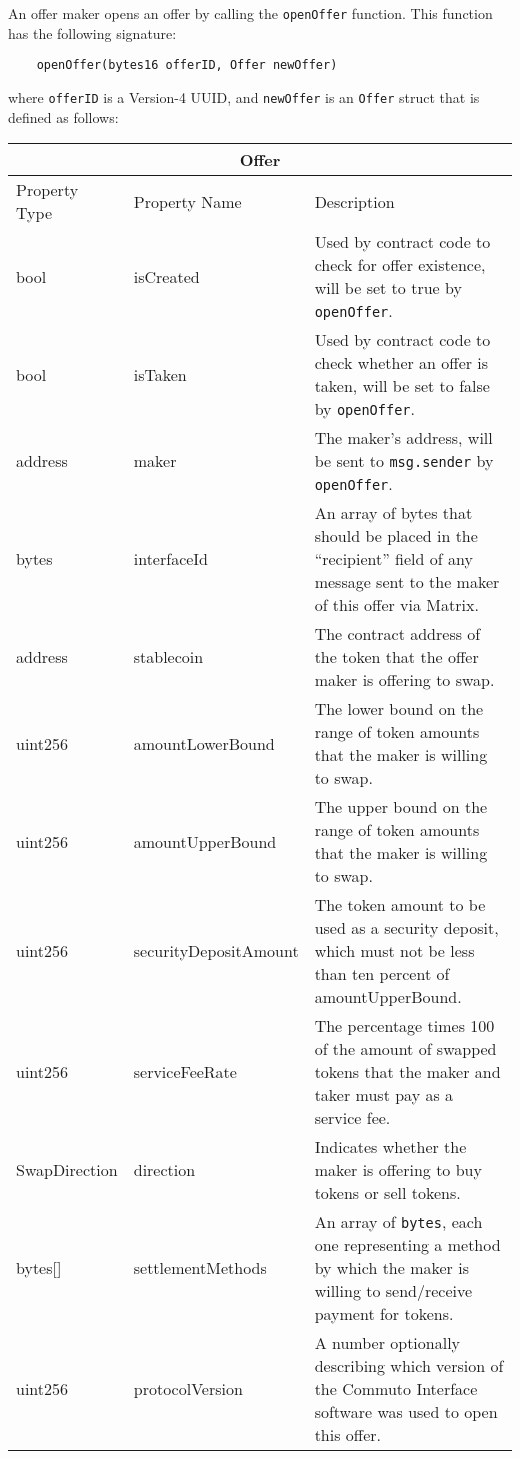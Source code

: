 \documentclass[11pt]{article}
\begin{document}
    An offer maker opens an offer by calling the \verb|openOffer| function.
    This function has the following signature:
    \begin{verbatim}
    openOffer(bytes16 offerID, Offer newOffer)
    \end{verbatim}
    where \verb|offerID| is a Version-4 UUID\cite{UUID}, and \verb|newOffer| is an \verb|Offer|
    struct that is defined as follows:
    \begin{longtable}[p]{ |p{2.5cm}|p{4cm}|p{7cm}| }
        \hline
        \multicolumn{3}{|c|}{Offer} \\
        \hline
        Property Type & Property Name & Description \\
        \hline
        bool & isCreated & Used by contract code to check for offer existence, will be set to true
        by \verb|openOffer|. \\
        bool & isTaken & Used by contract code to check whether an offer is taken, will be set to
        false by \verb|openOffer|. \\
        address & maker & The maker's address, will be sent to \verb|msg.sender| by \verb|openOffer|. \\
        bytes & interfaceId & An array of bytes that should be placed in the ``recipient'' field of any
        message sent to the maker of this offer via Matrix. \\
        address & stablecoin & The contract address of the token that the offer maker is offering to
        swap. \\
        uint256 & amountLowerBound & The lower bound on the range of token amounts that the maker is
        willing to swap. \\
        uint256 & amountUpperBound & The upper bound on the range of token amounts that the maker is
        willing to swap. \\
        uint256 & securityDepositAmount & The token amount to be used as a security deposit, which must
        not be less than ten percent of amountUpperBound. \\
        uint256 & serviceFeeRate & The percentage times 100 of the amount of swapped tokens that the
        maker and taker must pay as a service fee. \\
        SwapDirection & direction & Indicates whether the maker is offering to buy tokens or sell
        tokens. \\
        bytes[] & settlementMethods & An array of \verb|bytes|, each one representing a method by which
        the maker is willing to send/receive payment for tokens. \\
        uint256 & protocolVersion & A number optionally describing which version of the Commuto
        Interface software was used to open this offer. \\
        \hline
    \end{longtable}
\end{document}
